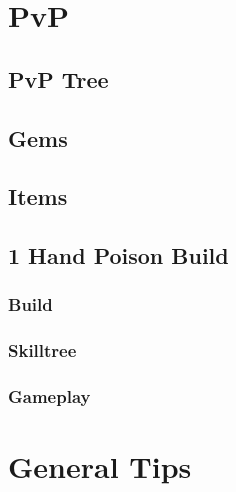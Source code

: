 \documentclass[12pt]{article}
\begin{document}
\newpage


\section{PvP}
\subsection{PvP Tree}
\subsection{Gems}
\subsection{Items}
\subsection{1 Hand Poison Build}
\subsubsection{Build}
\subsubsection{Skilltree}
\subsubsection{Gameplay}


\section{General Tips}
\end{document}
